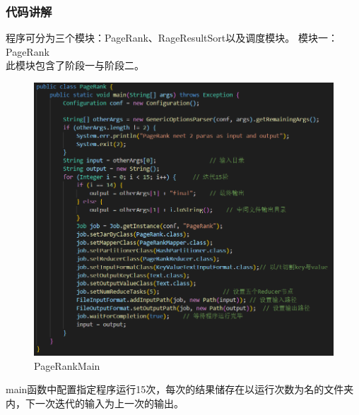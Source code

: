 \documentclass[a4paper,UTF8]{article}
\numberwithin{equation}{section}
\begin{document}
\subsubsection{代码讲解}
程序可分为三个模块：PageRank、RageResultSort以及调度模块。
模块一：PageRank\\
此模块包含了阶段一与阶段二。
\begin{figure}[H]
    \centering

    \includegraphics[width = 15cm]{PageRankMain.png}

    \caption{PageRankMain}
\end{figure}
main函数中配置指定程序运行15次，每次的结果储存在以运行次数为名的文件夹内，下一次迭代的输入为上一次的输出。
\end{document}
